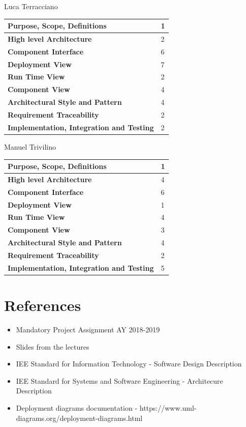 \documentclass[a4paper]{article}
\begin{document}
Luca Terracciano

\begin{center}
\begin{tabular}{|l | l |}
    \hline \bf{Purpose, Scope, Definitions} & 1 \\ \hline
    \bf{High level Architecture}  & 2 \\ \hline
    \bf{Component Interface} & 6 \\ \hline
    \bf{Deployment View} & 7 \\ \hline
    \bf{Run Time View} & 2\\ \hline
    \bf{Component View} & 4 \\ \hline
    \bf{Architectural Style and Pattern} & 4 \\ \hline
    \bf{Requirement Traceability} & 2 \\ \hline
    \bf{Implementation, Integration and Testing} & 2 \\ \hline
\end{tabular}
\end{center}

Manuel Trivilino

\begin{center}
\begin{tabular}{|l | l |}
    \hline \bf{Purpose, Scope, Definitions} & 1 \\ \hline
    \bf{High level Architecture}  & 4 \\ \hline
    \bf{Component Interface} & 6 \\ \hline
    \bf{Deployment View} & 1 \\ \hline
    \bf{Run Time View} & 4\\ \hline
    \bf{Component View} & 3 \\ \hline
    \bf{Architectural Style and Pattern} & 4 \\ \hline
    \bf{Requirement Traceability} & 2 \\ \hline
    \bf{Implementation, Integration and Testing} & 5 \\ \hline
\end{tabular}
\end{center}
\clearpage

\section{References}
\begin{itemize}
    \item Mandatory Project Assignment AY 2018-2019
    \item Slides from the lectures
    \item IEE Standard for Information Technology - Software Design Description
    \item IEE Standard for Systems and Software Engineering - Architecure Description
    \item Deployment diagrams documentation - https://www.uml-diagrams.org/deployment-diagrams.html
\end{itemize}
\end{document}
